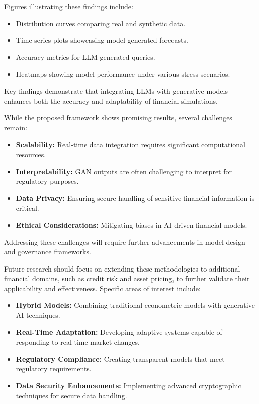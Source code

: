 \documentclass[a4paper,headinclude=on,footinclude=on,12pt,oneside]{scrbook}
\begin{document}
	Figures illustrating these findings include:
	
	\begin{itemize}
		\item Distribution curves comparing real and synthetic data.
		\item Time-series plots showcasing model-generated forecasts.
		\item Accuracy metrics for LLM-generated queries.
		\item Heatmaps showing model performance under various stress scenarios.
	\end{itemize}
	
	Key findings demonstrate that integrating LLMs with generative models enhances both the accuracy and adaptability of financial simulations.
	
	
	While the proposed framework shows promising results, several challenges remain:
	
	\begin{itemize}
		\item \textbf{Scalability:} Real-time data integration requires significant computational resources.
		\item \textbf{Interpretability:} GAN outputs are often challenging to interpret for regulatory purposes.
		\item \textbf{Data Privacy:} Ensuring secure handling of sensitive financial information is critical.
		\item \textbf{Ethical Considerations:} Mitigating biases in AI-driven financial models.
	\end{itemize}
	
	Addressing these challenges will require further advancements in model design and governance frameworks.
	
	
	Future research should focus on extending these methodologies to additional financial domains, such as credit risk and asset pricing, to further validate their applicability and effectiveness. Specific areas of interest include:
	
	\begin{itemize}
		\item \textbf{Hybrid Models:} Combining traditional econometric models with generative AI techniques.
		\item \textbf{Real-Time Adaptation:} Developing adaptive systems capable of responding to real-time market changes.
		\item \textbf{Regulatory Compliance:} Creating transparent models that meet regulatory requirements.
		\item \textbf{Data Security Enhancements:} Implementing advanced cryptographic techniques for secure data handling.
	\end{itemize}
	
\end{document}
